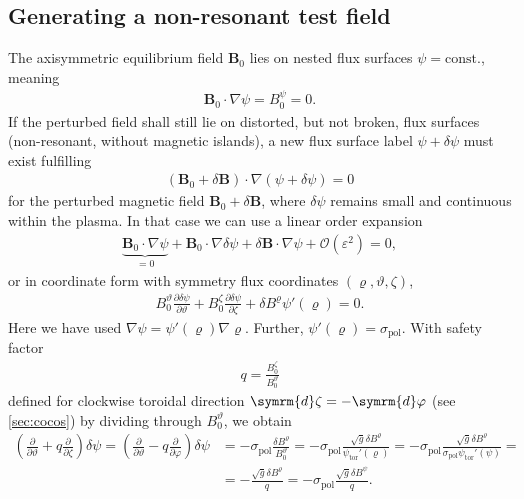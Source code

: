 \documentclass[a4paper, 10pt, english]{article}
\let\temp\varrho
\let\varrho\rho
\let\rho\temp
\let\temp\vartheta
\let\vartheta\theta
\let\theta\temp
\let\temp\varphi
\let\varphi\phi
\let\phi\temp
\let\vec\symbf
\newcommand*\diff{\ensuremath{\symrm{d}}}  %
\newcommand*\pd[2][]{\ensuremath{\frac{\partial #1}{\partial #2}}}  %
\newcommand*\pol{\ensuremath{\textrm{pol}}}  %
\newcommand*\tor{\ensuremath{\textrm{tor}}}  %
\begin{document}
\subsection{Generating a non-resonant test field}
\label{sec:nonres}

The axisymmetric equilibrium field $\vec{B}_{0}$ lies on nested flux surfaces $\psi = \text{const.}$, meaning
\begin{gather*}
  \vec{B}_{0} \cdot \nabla \psi = B_{0}^{\psi} = 0.
\end{gather*}
If the perturbed field shall still lie on distorted, but not broken, flux surfaces (non-resonant, without magnetic islands), a new flux surface label $\psi + \delta \psi$ must exist fulfilling
\begin{gather*}
  (\vec{B}_{0} + \delta \vec{B}) \cdot \nabla (\psi + \delta \psi) = 0
\end{gather*}
for the perturbed magnetic field $\vec{B}_{0} + \delta \vec{B}$, where $\delta \psi$ remains small and continuous within the plasma. In that case we can use a linear order expansion
\begin{gather*}
  \underbrace{\vec{B}_{0} \cdot \nabla \psi}_{= 0} + \vec{B}_{0} \cdot \nabla \delta \psi + \delta \vec{B} \cdot \nabla \psi + \mathcal{O}(\varepsilon^{2}) = 0,
\end{gather*}
or in coordinate form with symmetry flux coordinates $(\rho, \theta, \zeta)$,
\begin{gather*}
  B_{0}^{\theta} \pd[\delta \psi]{\theta} + B_{0}^{\zeta} \pd[\delta \psi]{\zeta} + \delta B^{\rho} \psi' (\rho) = 0.
\end{gather*}
Here we have used $\nabla \psi = \psi' (\rho) \nabla \rho$. Further, $\psi' (\rho) = \sigma_{\pol}$. With safety factor
\begin{gather*}
  q = \frac{B_{0}^{\zeta}}{B_{0}^{\theta}}
\end{gather*}
defined for clockwise toroidal direction $\diff \zeta = -\diff \phi$ (see \cref{sec:cocos}) by dividing through $B_{0}^{\theta}$, we obtain
\begin{align*}
  \left( \pd{\theta} + q \pd{\zeta} \right) \delta \psi = \left( \pd{\theta} - q \pd{\phi} \right) \delta \psi &= -\sigma_{\pol} \frac{\delta B^{\rho}}{B_{0}^{\theta}} = -\sigma_{\pol} \frac{\sqrt{g} \delta B^{\rho}}{\psi_{\tor}' (\rho)} = -\sigma_{\pol} \frac{\sqrt{g} \delta B^{\rho}}{\sigma_{\pol} \psi_{\tor}' (\psi)} = \\
  &= -\frac{\sqrt{g} \delta B^{\rho}}{q} = -\sigma_{\pol} \frac{\sqrt{g} \delta B^{\psi}}{q}.
\end{align*}
\end{document}
